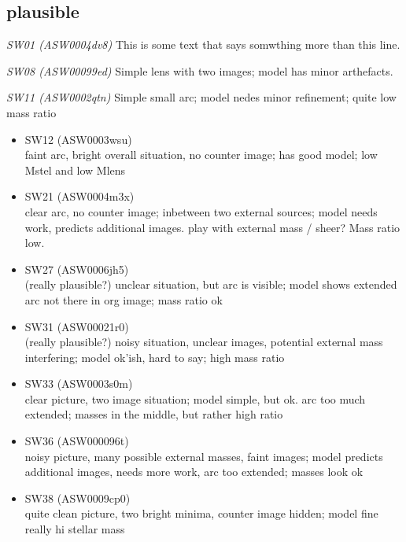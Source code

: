 \documentclass[a4paper,fleqn,usenatbib]{mnras}
\newcommand{\lenstitle}[1]{\noindent\textit{#1}\quad}
\begin{document}
\subsection{plausible}

\lenstitle{SW01 (ASW0004dv8)}
	This is some text that says somwthing more than this line.

\lenstitle{SW08 (ASW00099ed)}
  Simple lens with two images;
  model has minor arthefacts.

\lenstitle{SW11 (ASW0002qtn)}
  Simple small arc;
  model nedes minor refinement;
  quite low mass ratio
  
\begin{itemize}
  \item SW12 (ASW0003wsu) \\
  faint arc, bright overall situation, no counter image;
  has good model;
  low Mstel and low Mlens
  
  \item SW21 (ASW0004m3x) \\
  clear arc, no counter image; inbetween two external sources;
  model needs work, predicts additional images. play with external mass / sheer?
  Mass ratio low.
  
  \item SW27 (ASW0006jh5) \\
  (really plausible?)
  unclear situation, but arc is visible;
  model shows extended arc not there in org image;
  mass ratio ok
  
  \item SW31 (ASW00021r0) \\
  (really plausible?)
  noisy situation, unclear images, potential external mass interfering;
  model ok'ish, hard to say;
  high mass ratio
  
  \item SW33 (ASW0003s0m)\\
  clear picture, two image situation;
  model simple, but ok. arc too much extended;
  masses in the middle, but rather high ratio
  
  \item SW36 (ASW000096t) \\
  noisy picture, many possible external masses, faint images;
  model predicts additional images, needs more work, arc too extended;
  masses look ok
  
  \item SW38 (ASW0009cp0) \\
  quite clean picture, two bright minima, counter image hidden;
  model fine
  really hi stellar mass
  

\end{itemize}
\end{document}

